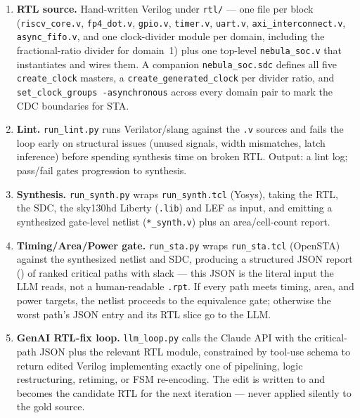 \documentclass[11pt]{article}
\begin{document}
\begin{enumerate}[leftmargin=1.4em, itemsep=4pt]

\item \textbf{RTL source.} Hand-written Verilog under
\texttt{rtl/} --- one file per block (\texttt{riscv\_core.v},
\texttt{fp4\_dot.v}, \texttt{gpio.v}, \texttt{timer.v}, \texttt{uart.v},
\texttt{axi\_interconnect.v}, \texttt{async\_fifo.v}, and one clock-divider
module per domain, including the fractional-ratio divider for domain~1)
plus one top-level \texttt{nebula\_soc.v} that instantiates and wires them.
A companion \texttt{nebula\_soc.sdc} defines all five \texttt{create\_clock}
masters, a \texttt{create\_generated\_clock} per divider ratio, and
\texttt{set\_clock\_groups -asynchronous} across every domain pair to mark
the CDC boundaries for STA.

\item \textbf{Lint.} \texttt{run\_lint.py} runs Verilator/slang against the
\texttt{.v} sources and fails the loop early on structural issues (unused
signals, width mismatches, latch inference) before spending synthesis time
on broken RTL. Output: a lint log; pass/fail gates progression to synthesis.

\item \textbf{Synthesis.} \texttt{run\_synth.py} wraps \texttt{run\_synth.tcl}
(Yosys), taking the RTL, the SDC, the sky130hd Liberty (\texttt{.lib}) and
LEF as input, and emitting a synthesized gate-level netlist
(\texttt{*\_synth.v}) plus an area/cell-count report.

\item \textbf{Timing/Area/Power gate.} \texttt{run\_sta.py} wraps
\texttt{run\_sta.tcl} (OpenSTA) against the synthesized netlist and SDC,
producing a structured JSON report ()
of ranked critical paths with slack --- this JSON is the literal input the
LLM reads, not a human-readable \texttt{.rpt}. If every path meets timing,
area, and power targets, the netlist proceeds to the equivalence gate;
otherwise the worst path's JSON entry and its RTL slice go to the LLM.

\item \textbf{GenAI RTL-fix loop.} \texttt{llm\_loop.py} calls the Claude API
with the critical-path JSON plus the relevant RTL module, constrained by tool-use
schema to return edited Verilog implementing exactly one of pipelining,
logic restructuring, retiming, or FSM re-encoding. The edit is written to
 and becomes the candidate RTL for the
next iteration --- never applied silently to the gold source.


\end{enumerate}
\end{document}
